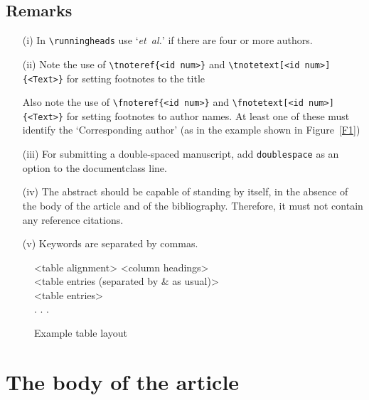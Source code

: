 \documentclass[fonts]{icst}
\begin{document}
\subsection{Remarks}
\begin{enumerate}
\item[(i)] In \verb"\runningheads" use `\emph{et~al.}' if there
are four or more authors.

\item[(ii)] Note the use of \verb"\tnoteref{<id num>}" and \verb "\tnotetext[<id num>]{<Text>}" for setting footnotes to the title

Also note the use of \verb"\fnoteref{<id num>}" and
\verb"\fnotetext[<id num>]{<Text>}" for setting footnotes to author names. At
least one of these must identify the `Corresponding author' (as in the example shown in Figure~\ref{F1})

\item[(iii)] For submitting a double-spaced manuscript, add
\verb"doublespace" as an option to the documentclass line.

\item[(iv)] The abstract should be capable of standing by itself,
in the absence of the body of the article and of the bibliography.
Therefore, it must not contain any reference citations.

\item[(v)] Keywords are separated by commas.
\end{enumerate}

\begin{figure}
\setlength{\fboxsep}{0pt}%
\setlength{\fboxrule}{0pt}%
\begin{center}
\begin{boxedverbatim}
\begin{table}\small\sf
\caption{<Table caption>}
\centering
\begin{tabular}{<table alignment>}
\toprule
<column headings>\\
\midrule
<table entries
(separated by & as usual)>\\
<table entries>\\
.
.
.\\
\bottomrule
\end{tabular}
\end{table}
\end{boxedverbatim}
\end{center}
\caption{Example table layout\label{F2}}
\end{figure}


\section{The body of the article}
\end{document}
